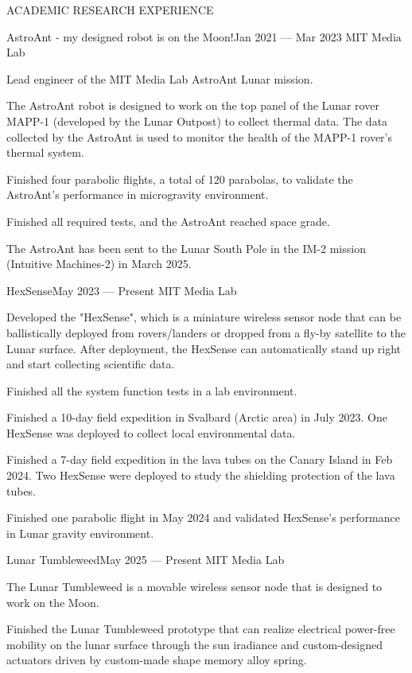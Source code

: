 \documentclass{resume} %
\begin{document}
\begin{rSection}{ACADEMIC RESEARCH EXPERIENCE}
\begin{rSubsection}{AstroAnt - my designed robot is on the Moon!}{Jan 2021 --- Mar 2023}{ }{MIT Media Lab}
    \item Lead engineer of the MIT Media Lab AstroAnt Lunar mission.
    \item The AstroAnt robot is designed to work on the top panel of the Lunar rover MAPP-1 (developed by the Lunar Outpost)
          to collect thermal data. The data collected by the AstroAnt is used to monitor the health of the MAPP-1 rover's thermal system.
    \item Finished four parabolic flights, a total of 120 parabolas, to validate the AstroAnt's performance in microgravity environment.
    \item Finished all required tests, and the AstroAnt reached space grade.
    \item The AstroAnt has been sent to the Lunar South Pole in the IM-2 mission (Intuitive Machines-2) in March 2025.
\end{rSubsection}

\break

\begin{rSubsection}{HexSense}{May 2023 --- Present}{ }{MIT Media Lab}
\item Developed the "HexSense", which is a miniature wireless sensor node that can be
ballistically deployed from rovers/landers or dropped from a fly-by satellite to the Lunar surface.
After deployment, the HexSense can automatically stand up right and start collecting scientific data.
\item Finished all the system function tests in a lab environment.
\item Finished a 10-day field expedition in Svalbard (Arctic area) in July 2023.
One HexSense was deployed to collect local environmental data.
\item Finished a 7-day field expedition in the lava tubes on the Canary Island in Feb 2024.
Two HexSense were deployed to study the shielding protection of the lava tubes.
\item Finished one parabolic flight in May 2024 and validated HexSense's performance in Lunar gravity environment.
\end{rSubsection}

\begin{rSubsection}{Lunar Tumbleweed}{May 2025 --- Present}{ }{MIT Media Lab}
\item The Lunar Tumbleweed is a movable wireless sensor node that is designed to work on the Moon.
\item Finished the Lunar Tumbleweed prototype that can realize electrical power-free mobility on the lunar surface through
the sun iradiance and custom-designed actuators driven by custom-made shape memory alloy spring.
\end{rSubsection}


\end{rSection}
\end{document}
